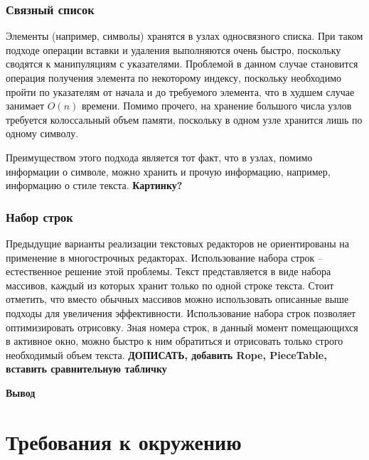 \documentclass{fefu}
\begin{document}
			\subsubsection{Связный список}
				\par Элементы (например, символы) хранятся в узлах односвязного списка. При таком подходе операции
				вставки и удаления выполняются очень быстро, поскольку сводятся к манипуляциям
				с указателями. Проблемой в данном случае становится операция получения элемента
				по некоторому индексу, поскольку необходимо пройти по указателям от начала и до
				требуемого элемента, что в худшем случае занимает $O(n)$ времени. Помимо
				прочего, на хранение большого числа узлов требуется колоссальный объем памяти, 
				поскольку в одном узле хранится лишь по одному символу. 
				\par Преимуществом этого подхода является тот факт, что в узлах, помимо
				информации о символе, можно хранить и прочую информацию, например, информацию
				о стиле текста.
				\textbf{Картинку?}
			\subsubsection{Набор строк}
				\par Предыдущие варианты реализации текстовых редакторов не ориентированы на
				применение в многострочных редакторах. Использование набора строк --
				естественное решение этой проблемы. Текст представляется в виде набора
				массивов, каждый из которых хранит только по одной строке текста. Стоит
				отметить, что вместо обычных массивов можно использовать описанные выше
				подходы для увеличения эффективности. Использование набора строк позволяет
				оптимизировать отрисовку. Зная номера строк, в данный момент помещающихся в 
				активное окно, можно быстро к ним обратиться и отрисовать только строго
				необходимый объем текста. \textbf{ДОПИСАТЬ, добавить Rope, PieceTable, 
				вставить сравнительную табличку}
		\par \textbf{Вывод}
	\section{Требования к окружению}
\end{document}
